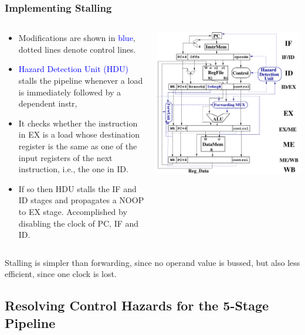 \documentclass{beamer}
\newcommand{\blue}[1]{\textcolor{Blue}{{#1}}}
\renewcommand{\emph}[1]{\textcolor{structure}{#1}}
\newcommand{\emp}[1]{\textcolor{DikuRed}{ #1}}
\begin{document}
\begin{frame}[fragile,t]
\frametitle{Implementing Stalling}

\begin{columns}
\begin{scriptsize}
\begin{itemize}
\item Modifications are shown in \blue{blue}, dotted lines denote
            control lines.\bigskip
\item \blue{Hazard Detection Unit (HDU)} \emph{stalls the pipeline} whenever
        a load is immediately followed by a dependent instr,\smallskip
\item It checks whether the instruction in EX is a load whose destination
        register is the same as one of the input registers of the 
        next instruction, i.e., the one in ID.\smallskip
\item If so then HDU \emph{stalls} the IF and ID stages 
        and propagates a NOOP to EX stage. Accomplished 
        by disabling the clock of PC, IF and ID.
\end{itemize}
\end{scriptsize}
\vspace{-2ex}
\includegraphics[width=37ex]{Figures/ClassicPipelineDH}
\end{columns}

\bigskip

\emph{Stalling is simpler than forwarding, since no operand value is bussed},
but also \emp{less efficient, since one clock is lost.}

\end{frame}

\subsection{Resolving Control Hazards for the 5-Stage Pipeline}
\end{document}
